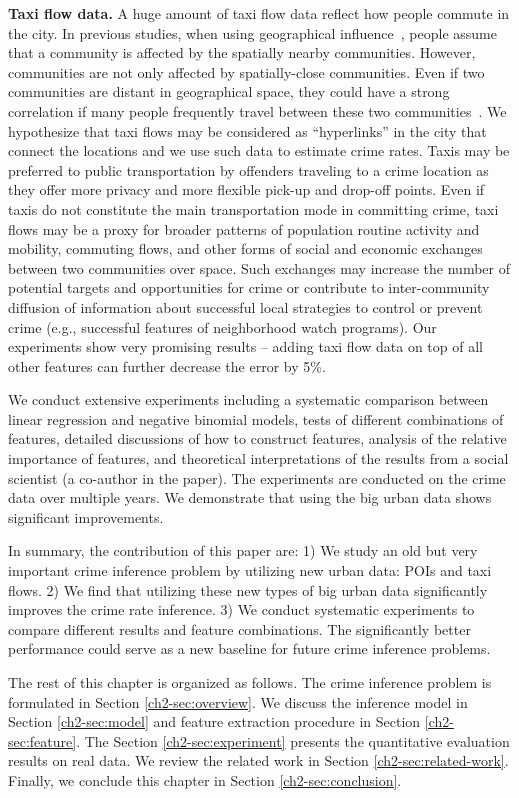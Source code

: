 \textbf{Taxi flow data.} A huge amount of taxi flow data reflect how people commute in the city. In previous studies, when using geographical influence~\cite{Ans02}, people assume that a community is affected by the spatially nearby communities. However, communities are not only affected by spatially-close communities. Even if two communities are distant in geographical space, they could have a strong correlation if many people frequently travel between these two communities~\cite{GGM14}. We hypothesize that taxi flows may be considered as ``hyperlinks'' in the city that connect the locations and we use such data to estimate crime rates. 
Taxis may be preferred to public transportation by offenders traveling to a crime location as they offer more privacy and more flexible pick-up and drop-off points. Even if taxis do not constitute the main transportation mode in committing crime, taxi flows may be a proxy for broader patterns of population routine activity and mobility, commuting flows, and other forms of social and economic exchanges between two communities over space. Such exchanges may  increase the number of potential targets and opportunities for crime \cite{CLFM79,BPBP95} or contribute to inter-community diffusion of information about successful local strategies to control  or prevent crime (e.g., successful features of neighborhood watch programs). Our experiments show very promising results --  adding taxi flow data on top of all other features can further decrease the error by 5\%.

We conduct extensive experiments including a systematic comparison between linear regression and negative binomial models, tests of different combinations of  features, detailed discussions of how to construct features, analysis of the relative importance of features, and theoretical interpretations of the results from a social scientist (a co-author in the paper). The experiments are conducted on the crime data over multiple years. We demonstrate that using the big urban data shows significant improvements.

In summary, the contribution of this paper are:  1) We study an old but very important crime inference problem by utilizing new urban data: POIs and taxi flows. 2) We find that utilizing these new types of big urban data significantly improves the crime rate inference. 3) We conduct systematic experiments to compare different results and feature combinations. The significantly better performance could serve as a new baseline for future crime inference problems.

The rest of this chapter is organized as follows. The crime inference problem is formulated in Section \ref{ch2-sec:overview}. We discuss the inference model in Section \ref{ch2-sec:model} and feature extraction procedure in Section \ref{ch2-sec:feature}. The Section \ref{ch2-sec:experiment} presents the quantitative evaluation results on real data. We review the related work in Section \ref{ch2-sec:related-work}.  Finally, we conclude this chapter in Section \ref{ch2-sec:conclusion}.

